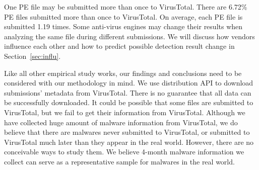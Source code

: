 One PE file may be submitted more than once to VirusTotal. 
There are 6.72\% PE files submitted more than once to VirusTotal. 
On average, each PE file is submitted 1.19 times. 
Some anti-virus engines may change their results when analyzing the same file during different submissions.
We will discuss how vendors influence each other and how to predict possible detection result change in Section~\ref{sec:influ}.

Like all other empirical study works, 
our findings and conclusions need to be considered with our methodology in mind. 
We use distribution API to download submissions' metadata from VirusTotal. 
There is no guarantee that all data can be successfully downloaded. 
It could be possible that some files are submitted to VirusTotal, 
but we fail to get their information from VirusTotal.
Although we have collected huge amount of malware information from VirusTotal,
we do believe that there are malwares never submitted to VirusTotal, 
or submitted to VirusTotal much later than they appear in the real world. 
However, there are no conceivable ways to study them.
We believe 4-month malware information we collect can serve as a representative sample for malwares in the real world. 

